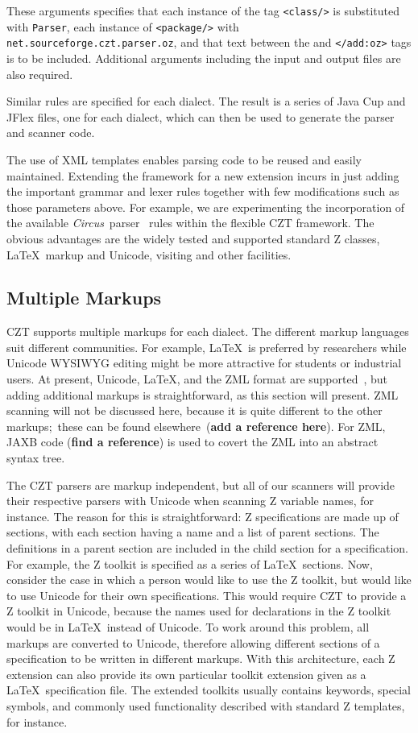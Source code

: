 \documentclass{llncs}
\newcommand{\Circus}{{\sf\slshape Circus}}
\begin{document}
These arguments specifies that each instance of the tag {\tt <class/>} is
substituted with {\tt Parser}, each instance of {\tt <package/>} with
{\tt net.sourceforge.czt.parser.oz}, and that text between the
{\tt <add:oz>} and {\tt </add:oz>} tags is to be included. Additional
arguments including the input and output files are also required.

Similar rules are specified for each dialect. The result is a series
of Java Cup and JFlex files, one for each dialect, which can then be
used to generate the parser and scanner code.

The use of XML templates enables parsing code to be reused and easily maintained.
Extending the framework for a new extension incurs in just adding the important
grammar and lexer rules together with few modifications such as those parameters above.
For example, we are experimenting the incorporation of the available \Circus\
parser~\cite{circus.other:parser} rules within the flexible CZT framework. The
obvious advantages are the widely tested and supported standard Z classes, \LaTeX\
markup and Unicode, visiting and other facilities.

\subsection{Multiple Markups}\label{multiple-markups}

 CZT supports multiple markups for each dialect.  The different
 markup languages suit different communities.  For example, \LaTeX\
 is preferred by researchers while Unicode WYSIWYG editing might be
 more attractive for students or industrial users. At present,
 Unicode, \LaTeX, and the ZML format are supported~\cite{UttEA:03},
 but adding additional markups is straightforward, as this section
 will present.  ZML scanning will not be discussed here, because it is
 quite different to the other markups;~these can be found elsewhere~({\bf add a reference here}).
 For ZML, JAXB code ({\bf find a reference}) is used to covert the ZML into an abstract syntax tree.

The CZT parsers are markup independent, but all of our scanners will
provide their respective parsers with Unicode when scanning Z variable
names, for instance. The reason for this is straightforward: Z specifications
are made up of sections, with each section having a name and a list of
parent sections. The definitions in a parent section are included in
the child section for a specification. For example, the Z toolkit is
specified as a series of \LaTeX\ sections. Now, consider the case in
which a person would like to use the Z toolkit, but would like to use
Unicode for their own specifications. This would require CZT to
provide a Z toolkit in Unicode, because the names used for
declarations in the Z toolkit would be in \LaTeX~instead of
Unicode. To work around this problem, all markups are converted to
Unicode, therefore allowing different sections of a specification to
be written in different markups.
With this architecture, each Z extension can also provide its own
particular toolkit extension given as a \LaTeX\ specification file.
The extended toolkits usually contains keywords, special symbols,
and commonly used functionality described with standard Z templates, for instance.
\end{document}
